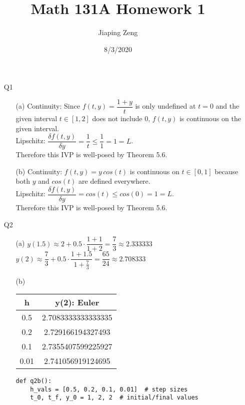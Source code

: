 \documentclass{article}
\title{Math 131A Homework 1}
\date{8/3/2020}
\author{Jiaping Zeng}
\begin{document}
\maketitle

\begin{itemize}
    \item [Q1]
          \begin{itemize}
              \item [(a)] Continuity: Since $f(t,y)=\dfrac{1+y}{t}$ is only undefined at $t=0$ and the given interval $t\in[1,2]$ does not include $0$, $f(t,y)$ is continuous on the given interval.\\Lipschitz: $\dfrac{\delta f(t,y)}{\delta y}=\dfrac{1}{t}\leq\dfrac{1}{1}=1=L$.\\Therefore this IVP is well-posed by Theorem 5.6.
              \item [(b)] Continuity: $f(t,y)=y\,cos(t)$ is continuous on $t\in[0,1]$ because both $y$ and $cos(t)$ are defined everywhere.\\Lipschitz: $\dfrac{\delta f(t,y)}{\delta y}=cos(t)\leq cos(0)=1=L$.\\Therefore this IVP is well-posed by Theorem 5.6.
          \end{itemize}
    \item [Q2]
          \begin{itemize}
              \item [(a)] $y(1.5)\approx 2+0.5\cdot\dfrac{1+1}{1+2}=\dfrac{7}{3}\approx 2.333333$\\$y(2)\approx \dfrac{7}{3}+0.5\cdot\dfrac{1+1.5}{1+\frac{7}{3}}=\boxed{\dfrac{65}{24}}\approx 2.708333$
              \item [(b)]
                    \begin{tabular}{|c|c|}
                        \hline
                        h    & y(2): Euler        \\
                        \hline
                        0.5  & 2.7083333333333335 \\
                        \hline
                        0.2  & 2.729166194327493  \\
                        \hline
                        0.1  & 2.7355407599225927 \\
                        \hline
                        0.01 & 2.741056919124695  \\
                        \hline
                    \end{tabular}
                    \begin{verbatim}
def q2b():
    h_vals = [0.5, 0.2, 0.1, 0.01]  # step sizes
    t_0, t_f, y_0 = 1, 2, 2  # initial/final values


\end{verbatim}
\end{itemize}
\end{itemize}
\end{document}
